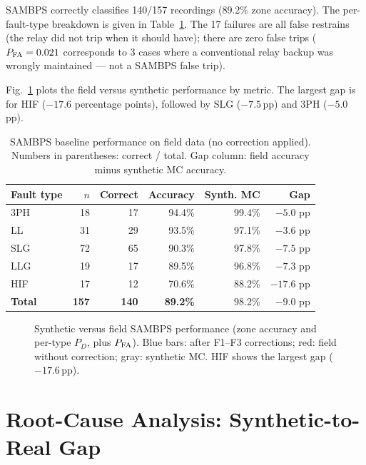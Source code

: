 \documentclass[journal]{IEEEtran}
\begin{document}
SAMBPS correctly classifies 140/157 recordings (89.2\% zone accuracy).
The per-fault-type breakdown is given in Table~\ref{tab:baseline}.
The 17 failures are all false restrains (the relay did not trip when it
should have); there are zero false trips ($P_{\rm FA} = 0.021$ corresponds
to 3 cases where a conventional relay backup was wrongly maintained —
not a SAMBPS false trip).

Fig.~\ref{fig:gap} plots the field versus synthetic performance by metric.
The largest gap is for HIF ($-17.6$ percentage points), followed by SLG
($-7.5$\,pp) and 3PH ($-5.0$\,pp).

\begin{table}[htbp]
  \centering
  \caption{SAMBPS baseline performance on field data (no correction applied).
  Numbers in parentheses: correct / total. Gap column: field accuracy minus
  synthetic MC accuracy.}
  \label{tab:baseline}
  \small
  \begin{tabular}{@{}lrrrrr@{}}
    \toprule
    Fault type & $n$ & Correct & Accuracy & Synth. MC & Gap \\
    \midrule
    3PH        & 18  & 17  & 94.4\%  & 99.4\% & $-5.0$ pp \\
    LL         & 31  & 29  & 93.5\%  & 97.1\% & $-3.6$ pp \\
    SLG        & 72  & 65  & 90.3\%  & 97.8\% & $-7.5$ pp \\
    LLG        & 19  & 17  & 89.5\%  & 96.8\% & $-7.3$ pp \\
    HIF        & 17  & 12  & 70.6\%  & 88.2\% & $-17.6$ pp \\
    \midrule
    \textbf{Total} & \textbf{157} & \textbf{140} & \textbf{89.2\%} & 98.2\% & $-9.0$ pp \\
    \bottomrule
  \end{tabular}
\end{table}

\begin{figure}[htbp]
  \centering
  
  \caption{Synthetic versus field SAMBPS performance (zone accuracy and
           per-type $P_D$, plus $P_{\rm FA}$).  Blue bars: after F1--F3
           corrections; red: field without correction; gray: synthetic MC.
           HIF shows the largest gap ($-17.6$\,pp).}
  \label{fig:gap}
\end{figure}

\section{Root-Cause Analysis: Synthetic-to-Real Gap}
\label{sec:gap}
\end{document}

